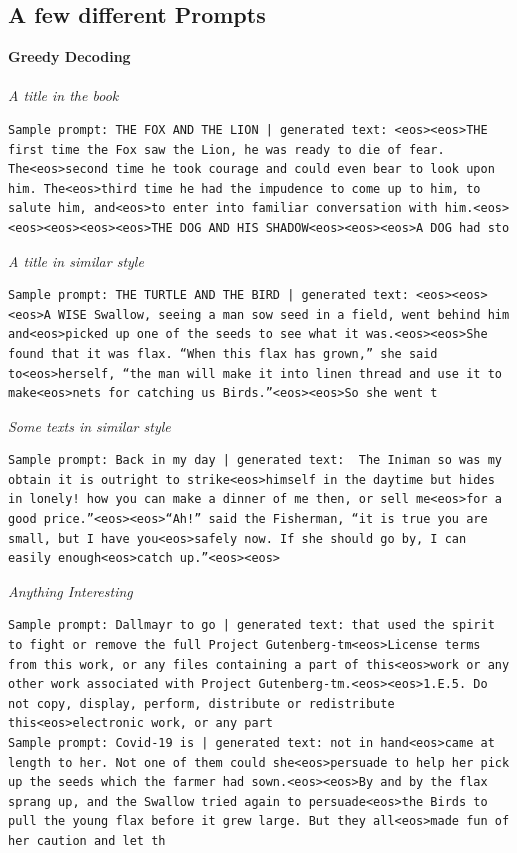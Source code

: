 \documentclass{article}
\begin{document}
\subsection{A few different Prompts}
\textbf{Greedy Decoding}\\\\
\emph{A title in the book}
\begin{lstlisting}
Sample prompt: THE FOX AND THE LION | generated text: <eos><eos>THE first time the Fox saw the Lion, he was ready to die of fear. The<eos>second time he took courage and could even bear to look upon him. The<eos>third time he had the impudence to come up to him, to salute him, and<eos>to enter into familiar conversation with him.<eos><eos><eos><eos><eos>THE DOG AND HIS SHADOW<eos><eos><eos>A DOG had sto
\end{lstlisting}
\emph{A title in similar style}
\begin{lstlisting}
Sample prompt: THE TURTLE AND THE BIRD | generated text: <eos><eos><eos>A WISE Swallow, seeing a man sow seed in a field, went behind him and<eos>picked up one of the seeds to see what it was.<eos><eos>She found that it was flax. “When this flax has grown,” she said to<eos>herself, “the man will make it into linen thread and use it to make<eos>nets for catching us Birds.”<eos><eos>So she went t
\end{lstlisting}
\emph{Some texts in similar style}
\begin{lstlisting}
Sample prompt: Back in my day | generated text:  The Iniman so was my obtain it is outright to strike<eos>himself in the daytime but hides in lonely! how you can make a dinner of me then, or sell me<eos>for a good price.”<eos><eos>“Ah!” said the Fisherman, “it is true you are small, but I have you<eos>safely now. If she should go by, I can easily enough<eos>catch up.”<eos><eos>
\end{lstlisting}
\emph{Anything Interesting}
\begin{lstlisting}
Sample prompt: Dallmayr to go | generated text: that used the spirit to fight or remove the full Project Gutenberg-tm<eos>License terms from this work, or any files containing a part of this<eos>work or any other work associated with Project Gutenberg-tm.<eos><eos>1.E.5. Do not copy, display, perform, distribute or redistribute this<eos>electronic work, or any part 
Sample prompt: Covid-19 is | generated text: not in hand<eos>came at length to her. Not one of them could she<eos>persuade to help her pick up the seeds which the farmer had sown.<eos><eos>By and by the flax sprang up, and the Swallow tried again to persuade<eos>the Birds to pull the young flax before it grew large. But they all<eos>made fun of her caution and let th
\end{lstlisting}
\end{document}
